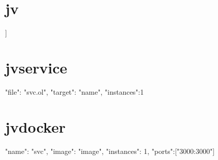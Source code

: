 \section*{jv}
\begin{jsonlisting}[][caption={Scaffolding architecture file.}, label={lst:jv_snippet}]
[
    [
        {"file": "svc.ol", "target": "name", "instances":1}
    ]
]
\end{jsonlisting}

\section*{jvservice}
\begin{jsonlisting}[][caption={Scaffolding top-level service.}]
{"file": "svc.ol", "target": "name", "instances":1}
\end{jsonlisting}

\section*{jvdocker}
\begin{jsonlisting}[][caption={Scaffolding top-level Docker service.}]
{"name": "svc", "image": "image", "instances": 1, "ports":["3000:3000"]}
\end{jsonlisting}